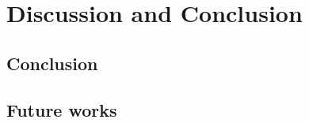 \documentclass[11pt, oneside]{book}
\begin{document}






\part{Discussion and Conclusion}

\chapter{Conclusion}

\chapter{Future works}

\printbibliography
\end{document}
